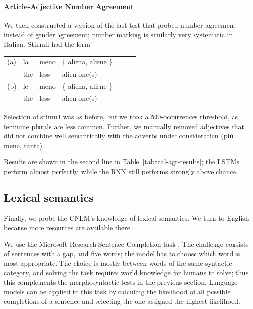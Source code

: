 \paragraph{Article-Adjective Number Agreement}
We then constructed a version of the last test that probed number agreement instead of gender agreement; number marking is similarly very systematic in Italian.
Stimuli had the form
\begin{tabular}{lllllll}
(a) & la & meno & \{ aliena, aliene \} \\
   &  the & less & alien one(s)  \\
(b) & le & meno & \{ aliena, aliene \} \\
    &the & less & alien one(s) \\
\end{tabular}
Selection of stimuli was  as before, but  we took a 500-occurrences threshold, as feminine plurals are less common.
Further, we manually removed adjectives that did not combine well semantically with the adverbs under consideration (pi{\`u}, meno, tanto).

Results are shown in the second line in Table~\ref{tab:ital-agr-results}; the LSTMs perform almost perfectly, while the RNN still performs strongly above chance.





\subsection{Lexical semantics}
\label{sec:semantics}

Finally, we probe the CNLM's knowledge of lexical semantics.
We turn to  English because more resources are available there.

We use the Microsoft Research Sentence Completion task \cite{Zweig:Burges:2011}.
The challenge consists of sentences with a gap, and five words; the model has to choose which word is most appropriate.
The choice is mostly between words of the same syntactic category, and solving the task requires world knowledge for humans to solve; thus this complements the morphosyntactic tests in the previous section.
Language models can be applied to this task by calculing the likelihood of all possible completions of a sentence and selecting the one assigned the highest likelihood.

